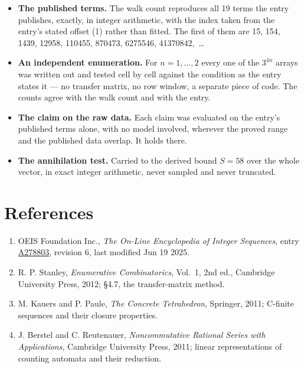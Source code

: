 \documentclass[11pt]{article}
\theoremstyle{definition}
\begin{document}
\begin{itemize}

\item {\bfseries The published terms.} The walk count reproduces all 19 terms the entry publishes, exactly, in integer arithmetic, with the index taken from the entry's stated offset (1) rather than fitted. The first of them are 15, 154, 1439, 12958, 110455, 870473, 6275546, 41370842,~\dots

\item {\bfseries An independent enumeration.} For $n = 1,\dots,2$ every one of the $3^{4n}$ arrays was written out and tested cell by cell against the condition as the entry states it --- no transfer matrix, no row window, a separate piece of code. The counts agree with the walk count and with the entry.

\item {\bfseries The claim on the raw data.} Each claim was evaluated on the entry's published terms alone, with no model involved, wherever the proved range and the published data overlap. It holds there.

\item {\bfseries The annihilation test.} Carried to the derived bound $S = 58$ over the whole vector, in exact integer arithmetic, never sampled and never truncated.

\end{itemize}

\section{References}

\begin{enumerate}

\item OEIS Foundation Inc., \emph{The On-Line Encyclopedia of Integer Sequences}, entry \href{https://oeis.org/A278803}{A278803}, revision 6, last modified Jun 19 2025.

\item R. P. Stanley, \emph{Enumerative Combinatorics}, Vol.~1, 2nd ed., Cambridge University Press, 2012; \S4.7, the transfer-matrix method.

\item M. Kauers and P. Paule, \emph{The Concrete Tetrahedron}, Springer, 2011; C-finite sequences and their closure properties.

\item J. Berstel and C. Reutenauer, \emph{Noncommutative Rational Series with Applications}, Cambridge University Press, 2011; linear representations of counting automata and their reduction.

\end{enumerate}
\end{document}
